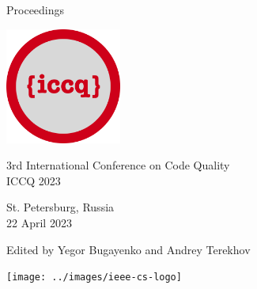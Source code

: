 
\thispagestyle{empty}
\begin{center}
Proceedings

\vspace{1in}

\includegraphics[height=1.5in]{../../logo}

\vspace{0.5in}

{\Large 3rd International Conference on Code Quality\\[12pt]
ICCQ 2023}

\vspace{0.5in}

St. Petersburg, Russia\\
22 April 2023

\vspace{0.5in}

Edited by Yegor Bugayenko and Andrey Terekhov

\vspace{1.5in}




\texttt{[image: ../images/ieee-cs-logo]}

\end{center}
